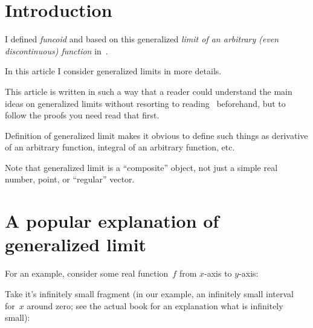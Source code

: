 \chapter{Introduction}

I defined \emph{funcoid} and based on this generalized \emph{limit of an arbitrary (even discontinuous) function} in~\cite{volume-1-edition1}.

In this article I consider generalized limits in more details.

This article is written in such a way that a reader could understand the main ideas on generalized limits without resorting to reading~\cite{volume-1-edition1} beforehand, but to follow the proofs you need read that first.

Definition of generalized limit makes it obvious to define such things as derivative of an arbitrary function, integral of an arbitrary function, etc.

Note that generalized limit is a ``composite'' object, not just a simple real number, point, or ``regular'' vector.

\chapter{A popular explanation of generalized limit}

For an example, consider some real function~$f$ from $x$-axis to $y$-axis:
\begin{figure}[H]
\end{figure}
 
Take it's infinitely small fragment (in our example, an infinitely small interval for~$x$ around zero; see the actual book for an explanation what is infinitely small):
\begin{figure}[H]
\end{figure}

